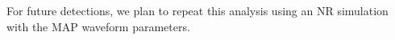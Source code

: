 For future detections, we plan to repeat this analysis using an NR simulation with the MAP waveform parameters. 










